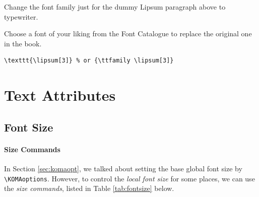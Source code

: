 \begin{exercisebox}
\begin{Exercise}
\label{exer:font}%
Change the font family just for the dummy Lipsum paragraph above to typewriter.
\end{Exercise}
\begin{Exercise}
Choose a font of your liking from the Font Catalogue to replace the original one in the book.
\end{Exercise}
\end{exercisebox}
%
\begin{Answer}[ref=exer:font]
\begin{lstlisting}
\texttt{\lipsum[3]} % or {\ttfamily \lipsum[3]}
\end{lstlisting}
\end{Answer}

\section{Text Attributes}

\subsection{Font Size}

\paragraph{Size Commands}
In Section \ref{sec:komaopt}, we talked about setting the base global font size by \texttt{\textbackslash KOMAoptions}. However, to control the \textit{local font size} for some places, we can use the \textit{size commands}, listed in Table \ref{tab:fontsize} below.

